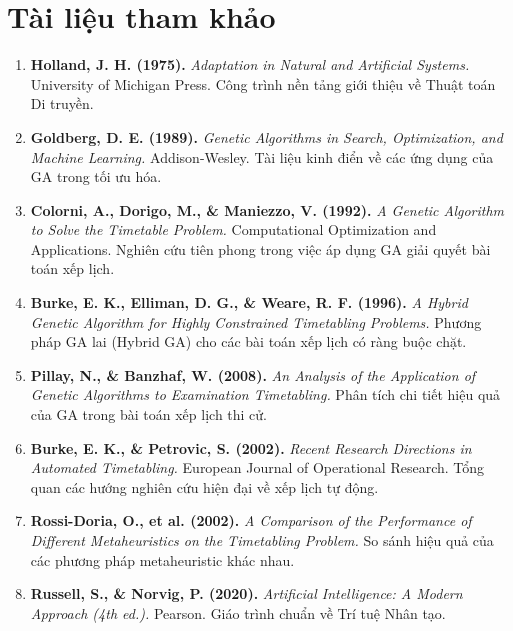 \section{Tài liệu tham khảo}
\sloppy

\begin{enumerate}
    \item \textbf{Holland, J. H. (1975).} \textit{Adaptation in Natural and Artificial Systems.} University of Michigan Press. Công trình nền tảng giới thiệu về Thuật toán Di truyền.

    \item \textbf{Goldberg, D. E. (1989).} \textit{Genetic Algorithms in Search, Optimization, and Machine Learning.} Addison-Wesley. Tài liệu kinh điển về các ứng dụng của GA trong tối ưu hóa.

    \item \textbf{Colorni, A., Dorigo, M., \& Maniezzo, V. (1992).} \textit{A Genetic Algorithm to Solve the Timetable Problem.} Computational Optimization and Applications. Nghiên cứu tiên phong trong việc áp dụng GA giải quyết bài toán xếp lịch.

    \item \textbf{Burke, E. K., Elliman, D. G., \& Weare, R. F. (1996).} \textit{A Hybrid Genetic Algorithm for Highly Constrained Timetabling Problems.} Phương pháp GA lai (Hybrid GA) cho các bài toán xếp lịch có ràng buộc chặt.

    \item \textbf{Pillay, N., \& Banzhaf, W. (2008).} \textit{An Analysis of the Application of Genetic Algorithms to Examination Timetabling.} Phân tích chi tiết hiệu quả của GA trong bài toán xếp lịch thi cử.

    \item \textbf{Burke, E. K., \& Petrovic, S. (2002).} \textit{Recent Research Directions in Automated Timetabling.} European Journal of Operational Research. Tổng quan các hướng nghiên cứu hiện đại về xếp lịch tự động.

    \item \textbf{Rossi-Doria, O., et al. (2002).} \textit{A Comparison of the Performance of Different Metaheuristics on the Timetabling Problem.} So sánh hiệu quả của các phương pháp metaheuristic khác nhau.

    \item \textbf{Russell, S., \& Norvig, P. (2020).} \textit{Artificial Intelligence: A Modern Approach (4th ed.).} Pearson. Giáo trình chuẩn về Trí tuệ Nhân tạo.


\end{enumerate}
